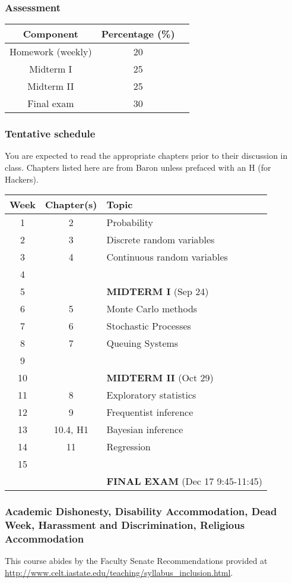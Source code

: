 \documentclass[12pt]{article}
\begin{document}

\subsubsection*{Assessment}
\begin{center}
\begin{tabular}{ccc}
Component & Percentage (\%) \\
\hline
Homework (weekly) & 20 \\
Midterm I & 25 \\
Midterm II & 25 \\
Final exam & 30 \\
\hline
\end{tabular}
\end{center}

\newpage
\subsubsection*{Tentative schedule}

You are expected to read the appropriate chapters prior to their discussion in class. Chapters listed here are from Baron unless prefaced with an H (for Hackers). 

\begin{center}
\begin{tabular}{ccl}
Week & Chapter(s) & Topic \\
\hline
1 & 2 & Probability \\
2 & 3 & Discrete random variables \\
3 & 4 & Continuous random variables \\
4 &  &  \\
\hline
5 & & {\bf MIDTERM I} (Sep 24) \\
\hline
6 & 5 & Monte Carlo methods \\
7 & 6 & Stochastic Processes \\
8 & 7 & Queuing Systems \\
9 &  &  \\
\hline
10 & & {\bf MIDTERM II} (Oct 29) \\
\hline
11 & 8 & Exploratory statistics \\
12 & 9 & Frequentist inference \\
13 & 10.4, H1 & Bayesian inference \\
14 & 11 & Regression \\
15 &  &  \\
\hline
&& {\bf FINAL EXAM} (Dec 17 9:45-11:45) \\
\hline
\end{tabular}
\end{center}

\subsubsection*{Academic Dishonesty, Disability Accommodation, Dead Week, Harassment and Discrimination, Religious Accommodation}

This course abides by the Faculty Senate Recommendations provided at \url{http://www.celt.iastate.edu/teaching/syllabus_inclusion.html}.
\end{document}

